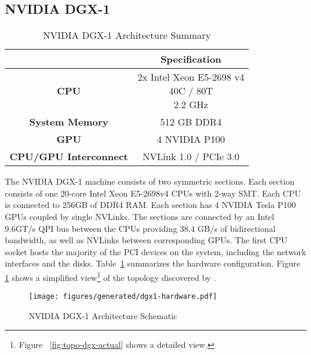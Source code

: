 \subsection{NVIDIA DGX-1}
\label{sec:dgx1}

\begin{table}[]
    \centering
    \caption[NVIDIA DGX-1 Architecture Summary]{NVIDIA DGX-1 Architecture Summary}
    \label{tab:dgx1}
    \begin{tabular}{|c|c|}
    \hline
    \textbf{} & \textbf{Specification}                                          \\ \hline
    \textbf{CPU}                  & \makecell{2x Intel Xeon E5-2698 v4 \\ 40C / 80T \\ 2.2 GHz} \\ \hline
    \textbf{System Memory}        & 512 GB DDR4                                                 \\ \hline
	\textbf{GPU}                  & 4 NVIDIA P100                                               \\ \hline
	\textbf{CPU/GPU Interconnect} & NVLink 1.0 / PCIe 3.0                                       \\ \hline
    \end{tabular}
\end{table}

The NVIDIA DGX-1 machine consists of two symmetric sections\cite{nvidia2017dgx1}.
Each section consists of one 20-core Intel Xeon E5-2698v4 CPUs with 2-way SMT.
Each CPU is connected to 256GB of DDR4 RAM.
Each section has 4 NVIDIA Tesla P100 GPUs coupled by single NVLinks.
The sections are connected by an Intel 9.6GT/s QPI bus between the CPUs providing 38.4 GB/s of bidirectional bandwidth, as well as NVLinks between corresponding GPUs.
The first CPU socket hosts the majority of the PCI devices on the system, including the network interfaces and the disks.
Table~\ref{tab:dgx1} summarizes the hardware configuration.
Figure \ref{fig:topo-dgx-simple} shows a simplified view\footnote{Figure ~\ref{fig:topo-dgx-actual} shows a detailed view.} of the topology discovered by .



\begin{figure}
    \centering
	\texttt{[image: figures/generated/dgx1-hardware.pdf]}
    \caption[NVIDIA DGX-1 Architecture Schematic]{NVIDIA DGX-1 Architecture Schematic}
    \label{fig:topo-dgx-simple}
\end{figure}


